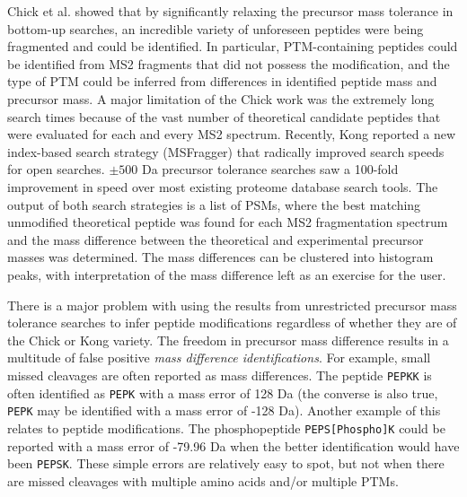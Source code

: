 \documentclass[journal=jprobs,manuscript=article]{achemso}
\begin{document}
Chick et al. showed that by significantly relaxing the precursor mass tolerance in bottom-up searches, an incredible variety of unforeseen peptides were being fragmented and could be identified\citep{Chick_2015}.
In particular, PTM-containing peptides could be identified from MS2 fragments that did not possess the modification, and the type of PTM could be inferred from differences in identified peptide mass and precursor mass.
A major limitation of the Chick work was the extremely long search times because of the vast number of theoretical candidate peptides that were evaluated for each and every MS2 spectrum.
Recently, Kong\citep{Kong_2017} reported a new index-based search strategy (MSFragger) that radically improved search speeds for open searches.
$\pm 500$ Da precursor tolerance searches saw a 100-fold improvement in speed over most existing proteome database search tools.
The output of both search strategies is a list of PSMs, where the best matching unmodified theoretical peptide was found for each MS2 fragmentation spectrum and the mass difference between the theoretical and experimental precursor masses was determined.
The mass differences can be clustered into histogram peaks\citep{Rodriguez_2014}, with interpretation of the mass difference left as an exercise for the user.

There is a major problem with using the results from unrestricted precursor mass tolerance searches to infer peptide modifications regardless of whether they are of the Chick or Kong variety.
The freedom in precursor mass difference results in a multitude of false positive \textit{mass difference identifications}.
For example, small missed cleavages are often reported as mass differences.
The peptide \texttt{PEPKK} is often identified as \texttt{PEPK} with a mass error of 128 Da (the converse is also true, \texttt{PEPK} may be identified with a mass error of -128 Da).
Another example of this relates to peptide modifications.
The phosphopeptide \texttt{PEPS[Phospho]K} could be reported with a mass error of -79.96 Da when the better identification would have been \texttt{PEPSK}.
These simple errors are relatively easy to spot, but not when there are missed cleavages with multiple amino acids and/or multiple PTMs.
\end{document}
